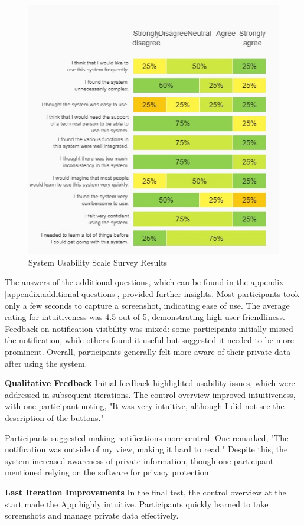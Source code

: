 \documentclass[sigconf,authordraft]{acmart}
\begin{document}
\begin{figure}[h]
  \centering
  \includegraphics[width=0.8\linewidth]{SUS study.jpeg}
  \caption{System Usability Scale Survey Results}
  \label{fig:sus_survey}
\end{figure}

The answers of the additional questions, which can be found in the appendix \ref{appendix:additional-questions}, provided further insights. Most participants took only a few seconds to capture a screenshot, indicating ease of use. The average rating for intuitiveness was 4.5 out of 5, demonstrating high user-friendliness. Feedback on notification visibility was mixed: some participants initially missed the notification, while others found it useful but suggested it needed to be more prominent. Overall, participants generally felt more aware of their private data after using the system.

\textbf{Qualitative Feedback}
Initial feedback highlighted usability issues, which were addressed in subsequent iterations. The control overview improved intuitiveness, with one participant noting, "It was very intuitive, although I did not see the description of the buttons."

Participants suggested making notifications more central. One remarked, "The notification was outside of my view, making it hard to read." Despite this, the system increased awareness of private information, though one participant mentioned relying on the software for privacy protection.

\textbf{Last Iteration Improvements}
In the final test, the control overview at the start made the App highly intuitive. Participants quickly learned to take screenshots and manage private data effectively.
\end{document}
